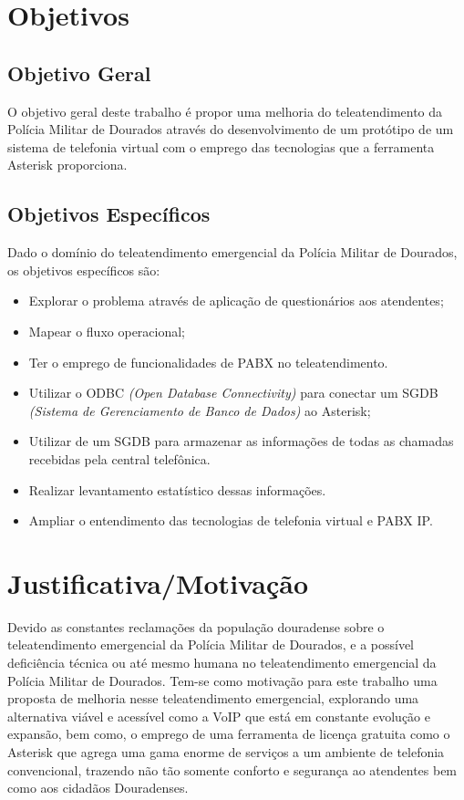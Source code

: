 \section{Objetivos}
\subsection{Objetivo Geral}
O objetivo geral deste trabalho é propor uma melhoria do teleatendimento da Polícia Militar de Dourados através do desenvolvimento de um protótipo de um sistema de telefonia virtual com o emprego das tecnologias que a ferramenta Asterisk proporciona.

\subsection{Objetivos Específicos}
Dado o domínio do teleatendimento emergencial da Polícia Militar de Dourados, os objetivos específicos são:

\begin{itemize}
	\item Explorar o problema através de aplicação de questionários aos atendentes;
	\item Mapear o fluxo operacional;
	\item Ter o emprego de funcionalidades de PABX no teleatendimento.
	\item Utilizar o ODBC \textit{(Open Database Connectivity)} para conectar um SGDB \textit{(Sistema de Gerenciamento de Banco de Dados)} ao Asterisk;
	\item Utilizar de um SGDB para armazenar as informações de todas as chamadas recebidas pela central telefônica.
	\item Realizar levantamento estatístico dessas informações.
	\item Ampliar o entendimento das tecnologias de telefonia virtual e PABX IP.
\end{itemize}

\section{Justificativa/Motivação}
Devido as constantes reclamações da população douradense sobre o teleatendimento emergencial da Polícia Militar de Dourados, e a possível deficiência técnica ou até mesmo humana no teleatendimento emergencial da Polícia Militar de Dourados. Tem-se como motivação para este trabalho uma proposta de melhoria nesse teleatendimento emergencial, explorando uma alternativa viável e acessível como a VoIP que está em constante evolução e expansão, bem como, o emprego de uma ferramenta de licença gratuita como o Asterisk que agrega uma gama enorme de serviços a um ambiente de telefonia convencional, trazendo não tão somente conforto e segurança ao atendentes bem como aos cidadãos Douradenses.

